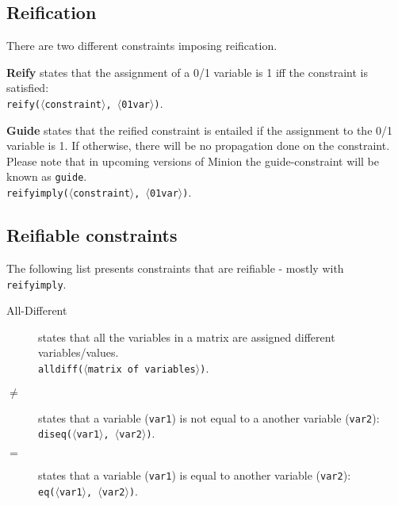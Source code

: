 \documentclass{article}
\begin{document}
\begin{small}
\subsection*{Reification}

There are two different constraints imposing reification.

\begin{description}
\item \textbf{Reify} states that the assignment of a 0/1 variable
is 1 iff the constraint is satisfied:\\
\texttt{reify($\langle$constraint$\rangle$, $\langle$01var$\rangle$)}.

\item \textbf{Guide} states that  the reified constraint is entailed if the 
assignment to the 0/1 variable is 1. If otherwise, there will be no propagation done 
on the constraint. Please note that in upcoming versions of Minion the guide-constraint will be known as 
\texttt{guide}. %
\\
\texttt{reifyimply($\langle$constraint$\rangle$, $\langle$01var$\rangle$)}.

\end{description}


\subsection*{Reifiable constraints}

The following list presents constraints that are reifiable - mostly with
 \texttt{reifyimply}.  

\begin{description}
\item[All-Different] states that all the variables in a matrix are
assigned different variables/values.\\ 
\texttt{alldiff($\langle$matrix of
variables$\rangle$)}.

\item[$ \mathbf{\neq}$] states that a variable (\texttt{var1}) is not
equal to a another variable (\texttt{var2}):\\
\texttt{diseq($\langle$var1$\rangle$, $\langle$var2$\rangle$)}.

\item[$\mathbf{=}$] states that a variable (\texttt{var1}) is equal to
another variable (\texttt{var2}):\\
\texttt{eq($\langle$var1$\rangle$, $\langle$var2$\rangle$)}.


\end{description}
\end{small}
\end{document}
